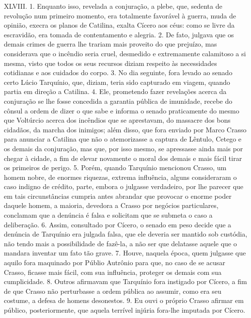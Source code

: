 XLVIII. 1. Enquanto isso, revelada a conjuração, a plebe, que, sedenta de
revolução num primeiro momento, era totalmente favorável à guerra, muda de
opinião, execra os planos de Catilina, exalta Cícero aos céus: como se livre da
escravidão, era tomada de contentamento e alegria. 2. De fato, julgava que os
demais crimes de guerra lhe trariam mais proveito do que prejuízo, mas
considerava que o incêndio seria cruel, desmedido e extremamente calamitoso a
si mesma, visto que todos os seus recursos diziam respeito às necessidades
cotidianas e aos cuidados do corpo. 3. No dia seguinte, fora levado ao senado
certo Lúcio Tarquínio, que, diziam, teria sido capturado em viagem, quando
partia em direção a Catilina. 4. Ele, prometendo fazer revelações acerca da
conjuração se lhe fosse concedida a garantia pública de imunidade, recebe do
cônsul a ordem de dizer o que sabe e informa o senado praticamente do mesmo que
Voltúrcio acerca dos incêndios que se aprestavam, do massacre dos bons
cidadãos, da marcha dos inimigos; além disso, que fora enviado por Marco Crasso
para anunciar a Catilina que não o atemorizasse a captura de Lêntulo, Cetego e
os demais da conjuração, mas que, por isso mesmo, se apressasse ainda mais por
chegar à cidade, a fim de elevar novamente o moral dos demais e mais fácil
tirar os primeiros de perigo. 5. Porém, quando Tarquínio mencionou Crasso, um
homem nobre, de enormes riquezas, extrema influência, alguns consideraram o
caso indigno de crédito, parte, embora o julgasse verdadeiro, por lhe parecer
que em tais circunstâncias cumpria antes abrandar que provocar o enorme poder
daquele homem, a maioria, devedora a Crasso por negócios particulares,
conclamam que a denúncia é falsa e solicitam que se submeta o caso a
deliberação. 6. Assim, consultado por Cícero, o senado em peso decide que a
denúncia de Tarquínio era julgada falsa, que ele deveria ser mantido sob
custódia, não tendo mais a possibilidade de fazê-la, a não ser que delatasse aquele que
o mandara inventar um fato tão grave. 7. Houve, naquela época, quem julgasse
que aquilo fora maquinado por Públio Autrônio para que, no caso de se acusar
Crasso, ficasse mais fácil, com sua influência, proteger os demais com sua
cumplicidade. 8. Outros afirmavam que Tarquínio fora instigado por Cícero, a
fim de que Crasso não perturbasse a ordem pública ao assumir, como era seu
costume, a defesa de homens desonestos. 9. Eu ouvi o próprio Crasso afirmar em
público, posteriormente, que aquela terrível injúria fora-lhe imputada por
Cícero.

